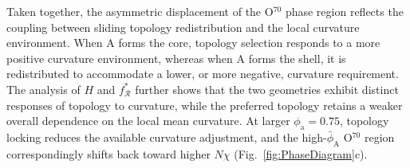 Taken together, the asymmetric displacement of the O$^{70}$ phase region reflects the coupling between sliding topology redistribution and the local curvature environment.
When A forms the core, topology selection responds to a more positive curvature environment, whereas when A forms the shell, it is redistributed to accommodate a lower, or more negative, curvature requirement.
The analysis of $H$ and $f_{\mathcal R}^{\ast}$ further shows that the two geometries exhibit distinct responses of topology to curvature, while the preferred topology retains a weaker overall dependence on the local mean curvature.
At larger $\phi_{\mathrm a}=0.75$, topology locking reduces the available curvature adjustment, and the high-$\bar{\phi}_{\mathrm A}$ O$^{70}$ region correspondingly shifts back toward higher $N\chi$ (Fig.~\ref{fig:PhaseDiagram}c).
